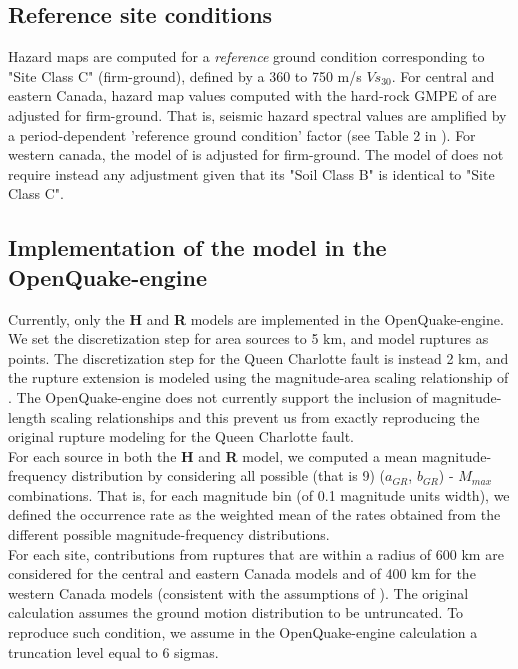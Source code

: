 \subsection{Reference site conditions}
Hazard maps are computed for a \textit{reference} ground condition corresponding to "Site Class C" (firm-ground), defined by a 360 to 750 m/s $Vs_{30}$. For central and eastern Canada, hazard map values computed with the hard-rock GMPE of \cite{ab1995} are adjusted for firm-ground. That is, seismic hazard spectral values are amplified by a period-dependent 'reference ground condition' factor (see Table 2 in \cite{adams2003}). For western canada, the model of \cite{y1997} is adjusted for firm-ground. The model of \cite{bjf1993} does not require instead any adjustment given that its "Soil Class B" is identical to "Site Class C".

\subsection{Implementation of the model in the OpenQuake-engine}
Currently, only the \textbf{H} and \textbf{R} models are implemented in the OpenQuake-engine. We set the discretization step for area sources to 5 km, and model ruptures as points. The discretization step for the Queen Charlotte fault is instead 2 km, and the rupture extension is modeled using the magnitude-area scaling relationship of \cite{wells1994}. The OpenQuake-engine does not currently support the inclusion of magnitude-length scaling relationships and this prevent us from exactly reproducing the original rupture modeling for the Queen Charlotte fault. \\
For each source in both the \textbf{H} and \textbf{R} model, we computed a mean magnitude-frequency distribution by considering all possible (that is 9) ($a_{GR}$, $b_{GR}$) - $M_{max}$ combinations. That is, for each magnitude bin (of 0.1 magnitude units width), we defined the occurrence rate as the weighted mean of the rates obtained from the different possible magnitude-frequency distributions.\\
For each site, contributions from ruptures that are within a radius of 600 km are considered for the central and eastern Canada models and of 400 km for the western Canada models (consistent with the assumptions of \cite{adams2003}). The original calculation assumes the ground motion distribution to be untruncated. To reproduce such condition, we assume in the OpenQuake-engine calculation a truncation level equal to 6 sigmas.

